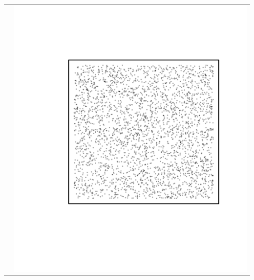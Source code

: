 \documentclass{article}\usepackage{graphicx, color}
\makeatletter
\def\maxwidth{ %
  \ifdim\Gin@nat@width>\linewidth
    \linewidth
  \else
    \Gin@nat@width
  \fi
}
\newenvironment{knitrout}{}{} %
\makeatother
\begin{document}
\begin{tabular}{cc}
&
\begin{knitrout}
\definecolor{shadecolor}{rgb}{0.969, 0.969, 0.969}\color{fgcolor}\includegraphics[width=\maxwidth]{figure/unnamed-chunk-36} 
\end{knitrout}

\\
\end{tabular}
\end{document}
